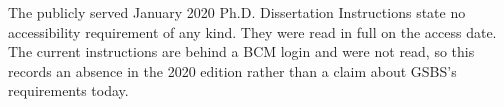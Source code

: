 
	{The publicly served January 2020 Ph.D. Dissertation Instructions state no
	 accessibility requirement of any kind. They were read in full on the access
	 date. The current instructions are behind a BCM login and were not read, so
	 this records an absence in the 2020 edition rather than a claim about
	 GSBS's requirements today.}

%
\newcommand{\bcm@dean}{}
\newcommand{\bcmdean}[1]{\renewcommand{\bcm@dean}{#1}}
\newcommand{\bcm@dirgradstudies}{}
\newcommand{\bcmdirectorofgraduatestudies}[1]{%
	\renewcommand{\bcm@dirgradstudies}{#1}}
%
\newcommand{\bcm@programline}{}
\newcommand{\bcmprogramapproval}[1]{\renewcommand{\bcm@programline}{#1}}
\newcommand{\bcm@theprogramline}{%
	\ifx\bcm@programline\@empty
		\MakeUppercase{\thesis@program} GRADUATE PROGRAM%
	\else
		\bcm@programline
	\fi
}

